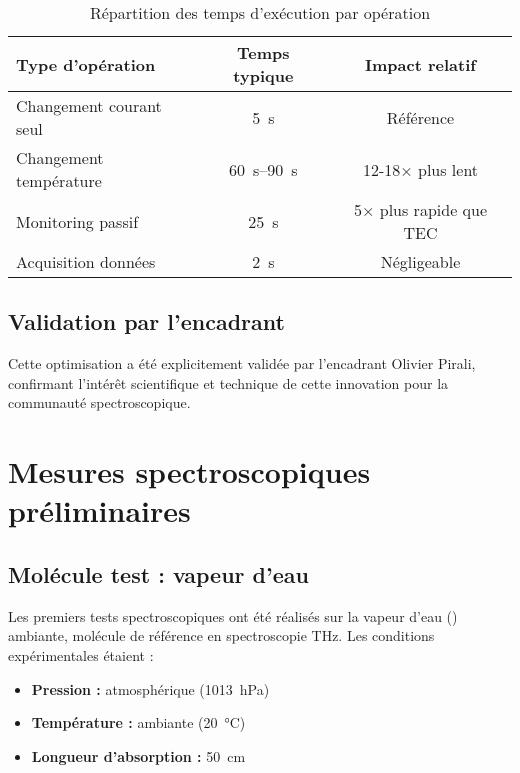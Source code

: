 \begin{table}[ht]
    \centering
    \caption{Répartition des temps d'exécution par opération}
    \label{tab:temps_operations}
    \begin{tabular}{lcc}
        \toprule
        \textbf{Type d'opération} & \textbf{Temps typique} & \textbf{Impact relatif} \\
        \midrule
        Changement courant seul & \SI{5}{\second} & Référence \\
        Changement température & \SIrange{60}{90}{\second} & 12-18× plus lent \\
        Monitoring passif & \SI{25}{\second} & 5× plus rapide que TEC \\
        Acquisition données & \SI{2}{\second} & Négligeable \\
        \bottomrule
    \end{tabular}
\end{table}

\subsection{Validation par l'encadrant}

Cette optimisation a été explicitement validée par l'encadrant Olivier Pirali, confirmant l'intérêt scientifique et technique de cette innovation pour la communauté spectroscopique.

\section{Mesures spectroscopiques préliminaires}

\subsection{Molécule test : vapeur d'eau}

Les premiers tests spectroscopiques ont été réalisés sur la vapeur d'eau (\HdO) ambiante, molécule de référence en spectroscopie THz. Les conditions expérimentales étaient :
\begin{itemize}
    \item \textbf{Pression :} atmosphérique (\SI{1013}{\hecto\pascal})
    \item \textbf{Température :} ambiante (\SI{20}{\celsius})
    \item \textbf{Longueur d'absorption :} \SI{50}{\centi\meter}
\end{itemize}

